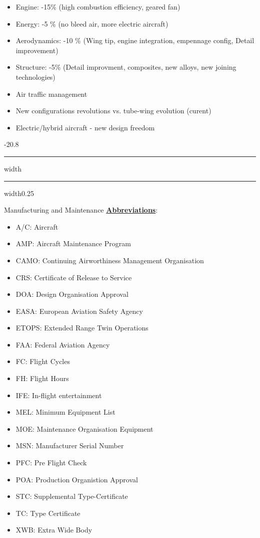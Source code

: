 \documentclass[9pt, landscape, fleqn]{scrartcl}
\makeatletter
\renewcommand{\section}{\@startsection{section}{1}{0mm}%
{-2\baselineskip}{0.8\baselineskip}%
{\hrule depth 0.2pt width\columnwidth\hrule depth1.5pt
width0.25\columnwidth\vspace*{1.2em}\Large\bfseries\rmfamily}}
\makeatother
\begin{document}
\begin{multicols*}{3}
\begin{itemize}
    \item Engine: -15\% (high combustion efficiency, geared fan)
    \item Energy: -5 \% (no bleed air, more electric aircraft)
    \item Aerodynamics: -10 \% (Wing tip, engine integration, empennage config, Detail improvement)
    \item Structure: -5\% (Detail improvment, composites, new alloys, new joining technologies)
    \item Air traffic management
    \item New configurations revolutions vs. tube-wing evolution (curent)
    \item Electric/hybrid aircraft - new design freedom
\end{itemize}
\section{Manufacturing and Maintenance}
\underline{\textbf{Abbreviations}}:
\begin{itemize}
    \item A/C: Aircraft
    \item AMP: Aircraft Maintenance Program
    \item CAMO: Continuing Airworthiness Management Organisation
    \item CRS: Certificate of Release to Service
    \item DOA: Design Organisation Approval
    \item EASA: European Aviation Safety Agency
    \item ETOPS: Extended Range Twin Operations
    \item FAA: Federal Aviation Agency
    \item FC: Flight Cycles
    \item FH: Flight Hours
    \item IFE: In-flight entertainment
    \item MEL: Minimum Equipment List 
    \item MOE: Maintenance Organisation Equipment
    \item MSN: Manufacturer Serial Number 
    \item PFC: Pre Flight Check
    \item POA: Production Organistion Approval 
    \item STC: Supplemental Type-Certificate 
    \item TC: Type Certificate 
    \item XWB: Extra Wide Body
\end{itemize}
\end{multicols*}
\end{document}
